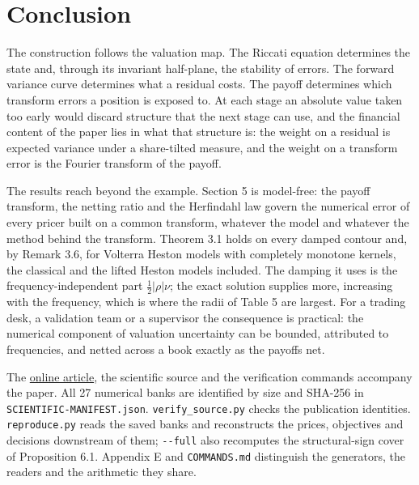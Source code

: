 \documentclass[11pt,a4paper]{article}
\newcommand{\code}[1]{\texttt{\small #1}}
\begin{document}
\setcounter{section}{7}\section{Conclusion}

The construction follows the valuation map. The Riccati equation determines the state and, through its invariant half-plane, the stability of errors. The forward variance curve determines what a residual costs. The payoff determines which transform errors a position is exposed to. At each stage an absolute value taken too early would discard structure that the next stage can use, and the financial content of the paper lies in what that structure is: the weight on a residual is expected variance under a share-tilted measure, and the weight on a transform error is the Fourier transform of the payoff.

The results reach beyond the example. Section 5 is model-free: the payoff transform, the netting ratio and the Herfindahl law govern the numerical error of every pricer built on a common transform, whatever the model and whatever the method behind the transform. Theorem 3.1 holds on every damped contour and, by Remark 3.6, for Volterra Heston models with completely monotone kernels, the classical and the lifted Heston models included. The damping it uses is the frequency-independent part \(\tfrac12|\rho|\nu\); the exact solution supplies more, increasing with the frequency, which is where the radii of Table 5 are largest. For a trading desk, a validation team or a supervisor the consequence is practical: the numerical component of valuation uncertainty can be bounded, attributed to frequencies, and netted across a book exactly as the payoffs net.

The \href{https://github.com/130U/RESEARCH-Certified-Joint-Pricing-Errors-in-Rough-Heston/blob/main/ARTICLE.md}{online article}, the scientific source and the verification commands accompany the paper. All 27 numerical banks are identified by size and SHA-256 in \code{SCIENTIFIC-\allowbreak{}MANIFEST.\allowbreak{}json}. \code{verify\_\allowbreak{}source.\allowbreak{}py} checks the publication identities. \code{reproduce.\allowbreak{}py} reads the saved banks and reconstructs the prices, objectives and decisions downstream of them; \code{-\allowbreak{}-\allowbreak{}full} also recomputes the structural-sign cover of Proposition 6.1. Appendix E and \code{COMMANDS.\allowbreak{}md} distinguish the generators, the readers and the arithmetic they share.

\appendix
\renewcommand{\thesection}{Appendix \Alph{section}}\renewcommand{\thesubsection}{\Alph{section}.\arabic{subsection}}
\end{document}
